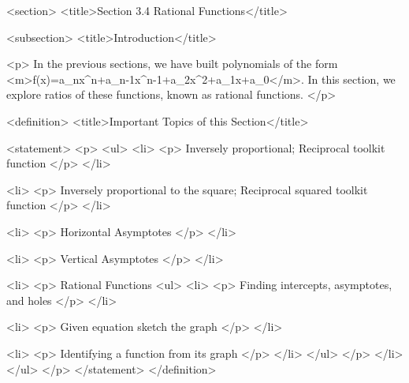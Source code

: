 <section>
    <title>Section 3.4 Rational Functions</title>

    <subsection>
        <title>Introduction</title>

        <p>
            In the previous sections, we have built polynomials of the form <m>f(x)=a_{n}x^{n}+a_{n-1}x^{n-1}+\cdots a_{2}x^{2}+a_{1}x+a_{0}</m>.
            In this section, we explore ratios of these functions, known as rational functions.
        </p>

        <definition>
            <title>Important Topics of this Section</title>

            <statement>
                <p>
                    <ul>
                        <li>
                            <p>
                                Inversely proportional; Reciprocal toolkit function
                            </p>
                        </li>

                        <li>
                            <p>
                                Inversely proportional to the square; Reciprocal squared toolkit function
                            </p>
                        </li>

                        <li>
                            <p>
                                Horizontal Asymptotes
                            </p>
                        </li>

                        <li>
                            <p>
                                Vertical Asymptotes
                            </p>
                        </li>

                        <li>
                            <p>
                                Rational Functions
                                <ul>
                                    <li>
                                        <p>
                                            Finding intercepts, asymptotes, and holes
                                        </p>
                                    </li>

                                    <li>
                                        <p>
                                            Given equation sketch the graph
                                        </p>
                                    </li>

                                    <li>
                                        <p>
                                            Identifying a function from its graph
                                        </p>
                                    </li>
                                </ul>
                            </p>
                        </li>
                    </ul>
                </p>
            </statement>
        </definition>

